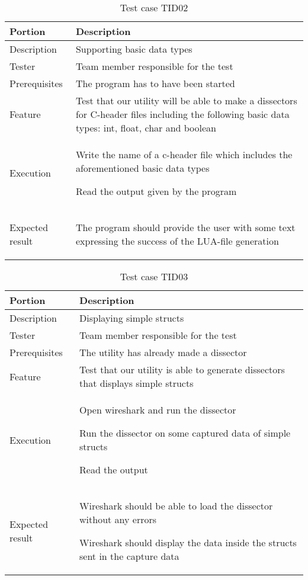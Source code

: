 \begin{table}[ht] \footnotesize \center
\caption{Test case TID02}
\begin{tabularx}{\textwidth}{l X}
	\toprule
	Portion & Description \\
	\midrule
	Description & Supporting basic data types \\
	Tester & Team member responsible for the test \\
	Prerequisites & The program has to have been started \\
	Feature & Test that our utility will be able to make a dissectors for C-header files including the following basic data types: int, float, char and boolean \\
	Execution & \begin{packed_enum}
		\item Write the name of a c-header file which includes the aforementioned basic data types
		\item Read the output given by the program \end{packed_enum} \\ 
	Expected result & \begin{packed_enum} \setcounter{enumi}{1}
		\item The program should provide the user with some text expressing the success of the LUA-file generation \end{packed_enum} \\
	\bottomrule
\end{tabularx}
\end{table}

\begin{table}[ht] \footnotesize \center
\caption{Test case TID03}
\begin{tabularx}{\textwidth}{l X}
	\toprule
	Portion & Description \\
	\midrule
	Description & Displaying simple structs \\
	Tester & Team member responsible for the test \\
	Prerequisites & The utility has already made a dissector \\
	Feature & Test that our utility is able to generate dissectors that displays simple structs \\
	Execution & \begin{packed_enum}
		\item Open wireshark and run the dissector
		\item Run the dissector on some captured data of simple structs
		\item Read the output \end{packed_enum} \\
	Expected result & \begin{packed_enum}
		\item Wireshark should be able to load the dissector without any errors
		\setcounter{enumi}{2}
		\item Wireshark should display the data inside the structs sent in the capture data \end{packed_enum} \\
	\bottomrule
\end{tabularx}
\end{table}

